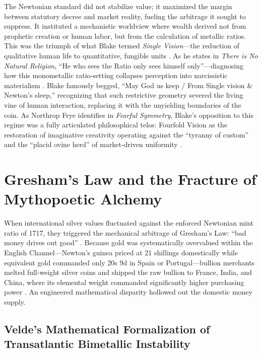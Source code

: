 \documentclass[
]{article}
\begin{document}
The Newtonian standard did not stabilize value; it maximized the margin
between statutory decree and market reality, fueling the arbitrage it
sought to suppress. It instituted a mechanistic worldview where wealth
derived not from prophetic creation or human labor, but from the
calculation of metallic ratios. This was the triumph of what Blake
termed \emph{Single Vision}---the reduction of qualitative human life to
quantitative, fungible units \citep{erdman1988complete}. As he states in
\emph{There is No Natural Religion}, ``He who sees the Ratio only sees
himself only''---diagnosing how this monometallic ratio-setting
collapses perception into narcissistic materialism
\citep{erdman1988complete}. Blake famously begged, ``May God us keep /
From Single vision \& Newton's sleep,'' recognizing that such
restrictive geometry severed the living vine of human interaction,
replacing it with the unyielding boundaries of the coin. As Northrop
Frye identifies in \emph{Fearful Symmetry}, Blake's opposition to this
regime was a fully articulated philosophical telos: Fourfold Vision as
the restoration of imaginative creativity operating against the
``tyranny of custom'' and the ``placid ovine herd'' of market-driven
uniformity \citep{frye1947fearful}.

\newpage

\section{Gresham's Law and the Fracture of Mythopoetic
Alchemy}\label{greshams-law-and-the-fracture-of-mythopoetic-alchemy}

When international silver values fluctuated against the enforced
Newtonian mint ratio of 1717, they triggered the mechanical arbitrage of
Gresham's Law: ``bad money drives out good'' \citep{thornton1802nature}.
Because gold was systematically overvalued within the English
Channel---Newton's guinea priced at 21 shillings domestically while
equivalent gold commanded only 20s 9d in Spain or Portugal---bullion
merchants melted full-weight silver coins and shipped the raw bullion to
France, India, and China, where its elemental weight commanded
significantly higher purchasing power \citep{quinn1996competing}. An
engineered mathematical disparity hollowed out the domestic money
supply.

\subsection{Velde's Mathematical Formalization of Transatlantic
Bimetallic
Instability}\label{veldes-mathematical-formalization-of-transatlantic-bimetallic-instability}
\end{document}
